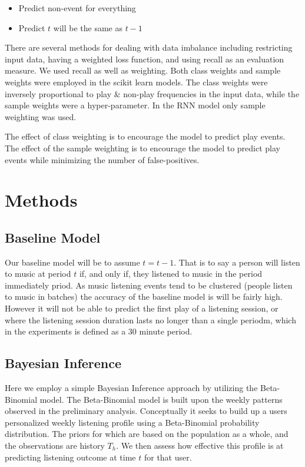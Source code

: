 \begin{itemize}
	\item Predict non-event for everything
	\item Predict $t$ will be the same as $t-1$
\end{itemize}
 
There are several methods for dealing with data imbalance \parencite{Brownlee} including restricting input data, having a weighted loss function, and using recall as an evaluation measure. We used recall as well as weighting. Both class weights and sample weights were employed in the scikit learn models. The class weights were inversely proportional to play \& non-play frequencies in the input data, while the sample weights were a hyper-parameter.  In the RNN model only sample weighting was used.

The effect of class weighting is to encourage the model to predict play events. The effect of the sample weighting is to encourage the model to predict play events while minimizing the number of false-positives.

\section{Methods}

\subsection{Baseline Model}

Our baseline model will be to assume $t = t-1$. That is to say a person will listen to music at period $t$ if, and only if, they listened to music in the period immediately priod. As music listening events tend to be clustered (people listen to music in batches) the accuracy of the baseline model is will be fairly high. However it will not be able to predict the first play of a listening session, or where the listening session duration lasts no longer than a single periodm, which in the experiments is defined as a 30 minute period.

\subsection{Bayesian Inference}

Here we employ a simple Bayesian Inference approach by utilizing the Beta-Binomial model. The Beta-Binomial model is built upon the weekly patterns observed in the preliminary analysis. Conceptually it seeks to build up a users personalized weekly listening profile using a Beta-Binomial probability distribution. The priors for which are based on the population as a whole, and the observations are history $T_h$. We then assess how effective this profile is at predicting listening outcome at time $t$ for that user.


